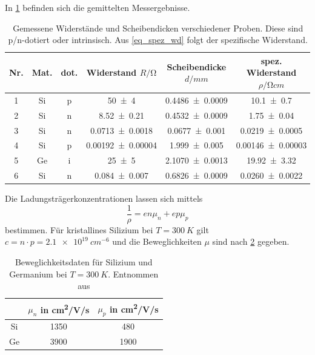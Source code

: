 \documentclass[
	a4paper,
	12pt,
	pagesize,
	ngerman
]{scrartcl}
\begin{document}
	In \cref{tb_spez_wd} befinden sich die gemittelten Messergebnisse.

	\begin{table}[H]
		\centering
		\begin{tabular}{c | c | c | c | c | c  }
			 Nr.& Mat. & dot. & Widerstand $R/\si{\ohm}$& Scheibendicke $d/\si{mm}$ & spez. Widerstand $\rho/\si{\ohm cm}$ \\ \hline %
			 1& Si& p& \SI{50+-4}{}&\SI{0.4486+-0.0009}{}& \SI{10.1+-0.7}{} \\
			 2& Si& n&\SI{8.52+-0.21}{}&\SI{0.4532+-0.0009}{}&\SI{1.75+-0.04}{} \\
			 3& Si& n&\SI{0.0713+-0.0018}{}&\SI{0.0677+-0.001}{}&\SI{0.0219+-0.0005}{} \\
			 4& Si& p&\SI{0.00192+-0.00004}{}&\SI{1.999+-0.005}{}&\SI{0.00146+-0.00003}{} \\ %
			 5& Ge& i&\SI{25+-5}{}&\SI{2.1070+-0.0013}{}&\SI{19.92+-3.32}{}  \\ %
			 6& Si& n&\SI{0.084+-0.007}{}&\SI{0.6826+-0.0009}{}&\SI{0.0260+-0.0022}{} \\
		\end{tabular}
		\caption{
		Gemessene Widerstände und Scheibendicken verschiedener Proben.
		Diese sind p/n-dotiert oder intrinsisch.
		Aus \cref{eq_spez_wd} folgt der spezifische Widerstand.
		}
		\label{tb_spez_wd}
	\end{table}

	Die Ladungsträgerkonzentrationen lassen sich mittels
	\begin{equation}
			\frac{1}{\rho}=en\mu_n + ep\mu_p
	\end{equation}
	bestimmen.
	Für kristallines Silizium bei $T=\SI{300}{K}$ gilt $c=n\cdot p=\SI{2.1e19}{cm^{-6}}$ und die Beweglichkeiten $\mu$ sind nach \cref{tb_beweg} gegeben.


	\begin{table}[H]
		\centering
		\begin{tabular}{c | c | c  }
			 &$\mu_n$ in \si{cm^2/V/s}&$\mu_p$ in \si{cm^2/V/s}\\ \hline
			 Si&1350&480 \\
			 Ge&3900&1900 \\
		\end{tabular}
		\caption{
		Beweglichkeitsdaten für Silizium und Germanium bei $T=\SI{300}{K}$. Entnommen aus \cite{anleitung} %
		}
		\label{tb_beweg}
	\end{table}
\end{document}
